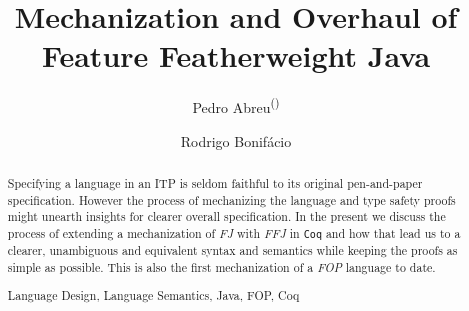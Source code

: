 \documentclass[runningheads,a4paper]{llncs}
\newcommand{\keywords}[1]{\par\addvspace\baselineskip
\noindent\keywordname\enspace\ignorespaces#1}
\begin{document}
\mainmatter  %

\title{Mechanization and Overhaul of Feature Featherweight Java}


%
%
\author{Pedro Abreu\textsuperscript{(\Letter)}%
\and Rodrigo Bonif\'acio}
%

%
%

\maketitle


\begin{abstract}
Specifying a language in an \ac{ITP} is seldom faithful
to its original pen-and-paper specification. However the process of mechanizing the
language and type safety proofs might unearth insights for clearer overall specification.
In the present we discuss the process of extending a mechanization of \textit{\ac{FJ}}
with \textit{\ac{FFJ}} in \texttt{Coq} and how that lead us to a
clearer, unambiguous and equivalent syntax and semantics while keeping the proofs as simple as possible.
This is also the first mechanization of a \textit{\ac{FOP}} language to date.


\keywords{Language Design, Language Semantics, Java, FOP, Coq}
\end{abstract}
\end{document}
